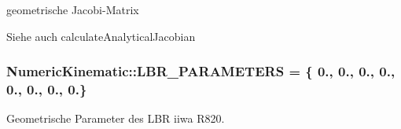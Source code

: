 geometrische Jacobi-\/\-Matrix 

\begin{DoxySeeAlso}{Siehe auch}
calculate\-Analytical\-Jacobian 
\end{DoxySeeAlso}
\hypertarget{classNumericKinematic_a1dc6a0780af1ef87cd5f6e8c95f1f7a7}{
\subsubsection[{L\-B\-R\-\_\-\-P\-A\-R\-A\-M\-E\-T\-E\-R\-S}]{\setlength{\rightskip}{0pt plus 5cm}Numeric\-Kinematic\-::\-L\-B\-R\-\_\-\-P\-A\-R\-A\-M\-E\-T\-E\-R\-S = \{ 0., 0., 0., 0., 0., 0., 0., 0.\}\hspace{0.3cm}{\ttfamily [private]}}}\label{classNumericKinematic_a1dc6a0780af1ef87cd5f6e8c95f1f7a7}


Geometrische Parameter des L\-B\-R iiwa R820. 

